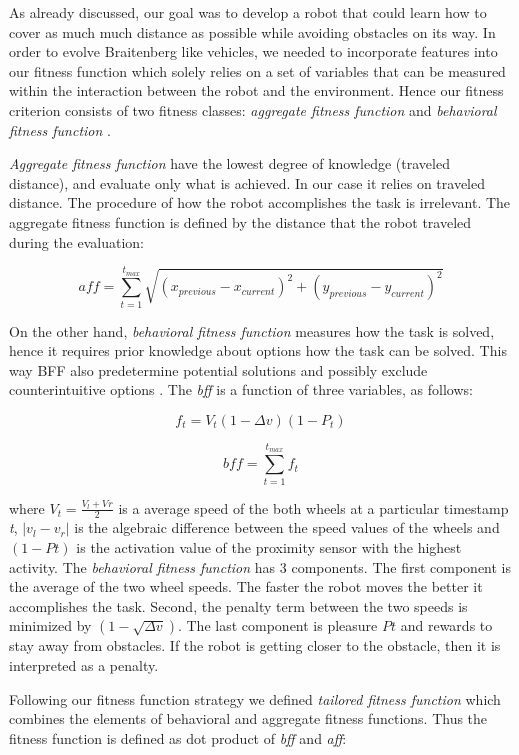 \documentclass[format=acmsmall, review=false, screen=true]{acmart}
\begin{document}
As already discussed, our goal was to develop a robot that could learn how to cover as much much distance as possible while avoiding obstacles on its way. In order to evolve Braitenberg like vehicles, we needed to incorporate features into our fitness function which solely relies on a set of variables that can be measured within the interaction between the robot and the environment. Hence our fitness criterion consists of two fitness classes: \emph{aggregate fitness function} and \emph{behavioral fitness function} \cite{divband2015effect}.

\emph{Aggregate fitness function} have the lowest degree of knowledge (traveled distance), and evaluate only what is achieved. In our case it relies on traveled distance. The procedure of how the robot accomplishes the task is irrelevant. The aggregate fitness function is defined by the distance that the robot traveled during the evaluation:

\[ aff = \sum_{t=1}^{t_{max}} \sqrt{(x_{previous} - x_{current})^2 + (y_{previous} - y_{current})^2} \]

On the other hand, \emph{behavioral fitness function} measures how the task is solved, hence it requires prior knowledge about options how the task can be solved. This way BFF also predetermine potential solutions and possibly exclude counterintuitive options \cite{divband2015effect}. The \emph{bff} is a function of three variables, as follows:


\[ f_{t} = V_{t} (1-\Delta v) (1 - P_{t}) \]

\[ bff = \sum_{t=1}^{t_{max}} f_{t} \]


where \(V_{t} = \frac{V_{l} + V_{}r}{2} \) is a average speed of the both wheels at a particular timestamp \emph{t}, \(|v_{l} - v_{r}|\) is the algebraic difference between the speed values of the wheels and \((1 - P{t})\) is the activation value of the proximity sensor with the highest activity. The \emph{behavioral fitness function} has 3 components. The first component is the average of the two wheel speeds. The faster the robot moves the better it accomplishes the task. Second, the penalty term between the two speeds is minimized by \((1-\sqrt{\Delta v})\). The last component is pleasure \(P{t}\) and rewards to stay away from obstacles. If the robot is getting closer to the obstacle, then it is interpreted as a penalty.

Following our fitness function strategy we defined \emph{tailored fitness function} which combines the elements of behavioral and aggregate fitness functions. Thus the fitness function is defined as dot product of \emph{bff} and \emph{aff}:
\end{document}
